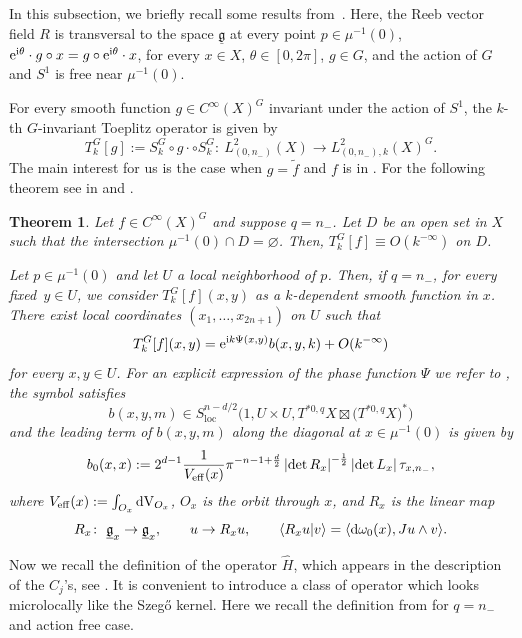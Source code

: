 \documentclass[pdftex]{sigma}
\numberwithin{equation}{section}
\newtheorem{Theorem}{Theorem}[section]
\newcommand{\abs}[1]{\left\vert#1\right\vert}
\newcommand{\To}{\rightarrow}
\begin{document}
	 In this subsection, we briefly recall some results from~\cite{gh}. Here, the Reeb vector field $R$ is transversal to the space $\underline{\mathfrak{g}}$ at every point $p\in\mu^{-1}(0)$,
${\rm e}^{{\rm i}\theta}\cdot g\circ x=g\circ {\rm e}^{{\rm i}\theta}\cdot x$, for every $ x\in X$, $\theta\in[0,2\pi]$, $ g\in G$,
	 and the action of $G$ and $S^1$ is free near $\mu^{-1}(0)$.
		
	For every smooth function $g\in{C}^\infty(X)^G$ invariant under the action of $S^1$, the $k$-th $G$-invariant Toeplitz operator is given by
	 \[
	 	T^G_{k}[g]:=S^{G}_{k}\circ g\cdot\circ S^{G}_{k}\colon\ L^2_{(0,n_-)}(X)\To L^2_{(0,n_-),k}(X)^G.
	 \]
	 The main interest for us is the case when $g=\tilde{f}$ and $f$ is in . For the following theorem see in \cite[Theorem 1.8]{hsiaohuang} and \cite{gh}.
	
	 \begin{Theorem} \label{thm:kfourierszego}
	 	Let $f\in{C}^\infty(X)^G$ and suppose $q= n_-$. Let $D$ be an open set in $X$ such that the intersection $\mu^{-1}(0)\cap D= \varnothing$. Then, $T^{G}_{k}[f]\equiv O(k^{-\infty})$ on $D$.
	 	
	 	Let $p\in \mu^{-1}(0)$ and let $U$ a local neighborhood of $p$. Then, if $q= n_-$, for every fixed~${y\in U}$, we consider $T_{k}^{G}[f](x,y)$ as a $k$-dependent smooth function in $x$. There exist local coordinates $(x_1,\dots ,x_{2n+1})$ on $U$ such that
	 	\[T^G_{k}[f](x, y)= {\rm e}^{{\rm i} k \Psi(x, y)} b(x, y, k)+O(k^{-\infty}) \]
	 	for every $x, y\in U$. For an explicit expression of the phase function $\Psi$ we refer to {\rm\cite{gh}}, the symbol satisfies
	 	\[b(x, y, m)\in S^{n-d/2}_{\mathrm{loc}}\bigl(1, U\times U, T^{*0,q}X\boxtimes\bigl(T^{*0,q}X\bigr)^*\bigr) \]
	 	and the leading term of $b(x,y,m)$ along the diagonal at $x\in\mu^{-1}(0)$ is given by
	 	\[b_0(x, x):= 2^{d-1}\frac{1}{V_{{\rm eff }}(x)}\pi^{-n-1+\frac{d}{2}}\abs{\det R_x}^{-\frac{1}{2}}\abs{\det{L}_{x}}\tau_{x,n_-},
 \]
	 	where
$V_{{\rm eff }}(x):=\int_{O_x}{\rm dV}_{O_x}$,
	 	$O_x$ is the orbit through $x$, and $R_x$ is the linear map
	 	\[
	 		R_x\colon\ \underline{\mathfrak{g}}_x\To\underline{\mathfrak{g}}_x,\qquad
	 		u\To R_xu,\qquad\langle R_xu | v \rangle=\langle {\rm d}\omega_0(x) , Ju\wedge v \rangle.
	 	\]
	 \end{Theorem}
	
 Now we recall the definition of the operator $\hat{H}$, which appears in the description of the $C_j$'s, see \cite{gh}. It is convenient to introduce a class of operator which looks microlocally like the Szeg\H{o} kernel. Here we recall the definition from \cite{gh} for $q=n_-$ and action free case.
\end{document}
